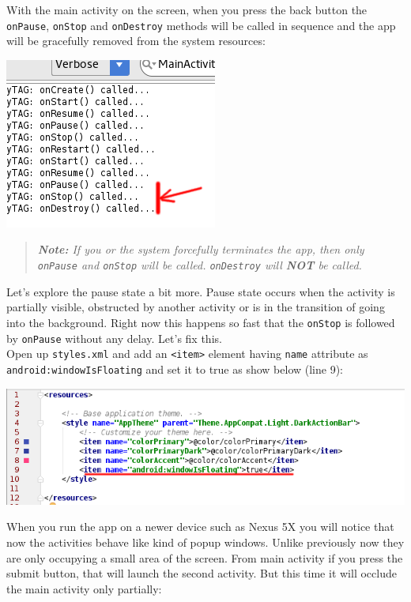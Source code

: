 With the main activity on the screen, when you press the back button the \texttt{onPause}, \texttt{onStop} and \texttt{onDestroy} methods will be called in sequence and the app will be gracefully removed from the system resources:

\begin{center}
	\includegraphics[scale=0.4]{chapters/ch08/images/12}
\end{center}

\begin{quote}
	\textit{\textbf{Note:} If you or the system forcefully terminates the app, then only \texttt{onPause} and \texttt{onStop} will be called. \texttt{onDestroy} will \textbf{NOT} be called.}
\end{quote}

Let's explore the pause state a bit more. Pause state occurs when the activity is partially visible, obstructed by another activity or is in the transition of going into the background. Right now this happens so fast that the \texttt{onStop} is followed by \texttt{onPause} without any delay. Let's fix this. \\

Open up \texttt{styles.xml} and add an \texttt{<item>} element having \texttt{name} attribute as \texttt{android:windowIsFloating} and set it to true as show below (line 9):

\begin{center}
	\includegraphics[scale=0.4]{chapters/ch08/images/13}
\end{center}

When you run the app on a newer device such as Nexus 5X you will notice that now the activities behave like kind of popup windows. Unlike previously now they are only occupying a small area of the screen. From main activity if you press the submit button, that will launch the second activity. But this time it will occlude the main activity only partially:

